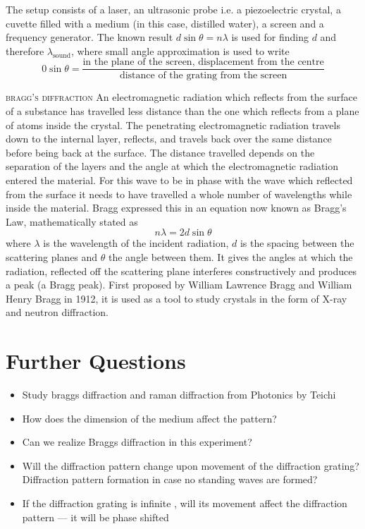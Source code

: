 	The setup consists of a laser, an ultrasonic probe i.e. a piezoelectric crystal, a cuvette filled with a medium (in this case, distilled water), a screen and a frequency generator. The known result $d \sin \theta = n \lambda$ is used for finding $d$ and therefore $\lambda_\text{sound}$, where small angle approximation is used to write 
	\begin{equation*}0
		\sin \theta = \frac {\text{in the plane of the screen, displacement from the centre}}{\text{distance of the grating from the screen}}
	\end{equation*}

	\textsc{bragg's diffraction}
	An electromagnetic radiation which reflects from the surface of a substance has travelled less distance than the one which reflects from a plane of atoms inside the crystal. The penetrating electromagnetic radiation travels down to the internal layer, reflects, and travels back over the same distance before being back at the surface. The distance travelled depends on the separation of the layers and the angle at which the electromagnetic radiation entered the material. For this wave to be in phase with the wave which reflected from the surface it needs to have travelled a whole number of wavelengths while inside the material. Bragg expressed this in an equation now known as Bragg's Law, mathematically stated as 
	\begin{equation*}
	n \lambda = 2d \sin \theta
	\end{equation*}
	where $\lambda$ is the wavelength of the incident radiation, $d$ is the spacing between the scattering planes and $\theta$ the angle between them.
	It gives the angles at which the radiation, reflected off the scattering plane interferes constructively and produces a peak (a Bragg peak).
	First proposed by William Lawrence Bragg and William Henry Bragg in 1912, it is used as a tool to study crystals in the form of X-ray and neutron diffraction. 





\section{Further Questions}
	\begin{itemize}
		\item Study braggs diffraction and raman diffraction from Photonics by Teichi 
		\item How does the dimension of the medium affect the pattern?
		\item Can we realize Braggs diffraction in this experiment?
		\item Will the diffraction pattern change upon movement of the diffraction grating? Diffraction pattern formation in case no standing waves are formed?
		\item If the diffraction grating is infinite , will its movement affect the diffraction pattern --- it will be phase shifted
	\end{itemize}

